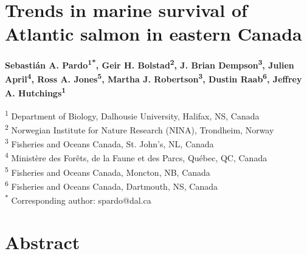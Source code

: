 \documentclass[12pt]{article}
\begin{document}
\linenumbers


\section*{Trends in marine survival of Atlantic salmon in eastern Canada}

\textbf{Sebasti\'{a}n A. Pardo\textsuperscript{1*}, 
        Geir H. Bolstad\textsuperscript{2}, 
        J. Brian Dempson\textsuperscript{3}, 
        Julien April\textsuperscript{4}, 
        Ross A. Jones\textsuperscript{5}, 
        Martha J. Robertson\textsuperscript{3}, 
        Dustin Raab\textsuperscript{6}, 
Jeffrey A. Hutchings\textsuperscript{1}} 

\noindent\small{\textsuperscript{1} Department of Biology, Dalhousie University, Halifax, NS, Canada\\}
\small{\textsuperscript{2} Norwegian Institute for Nature Research (NINA), Trondheim, Norway\\}
\small{\textsuperscript{3} Fisheries and Oceans Canada, St. John's, NL, Canada\\}
\small{\textsuperscript{4} Minist\`{e}re des For\^{e}ts, de la Faune et des Parcs, Qu\'{e}bec, QC, Canada\\}
\small{\textsuperscript{5} Fisheries and Oceans Canada, Moncton, NB, Canada\\}
\small{\textsuperscript{6} Fisheries and Oceans Canada, Dartmouth, NS, Canada\\}
\small{\textsuperscript{*} Corresponding author: spardo@dal.ca}

\section*{Abstract}
\end{document}
